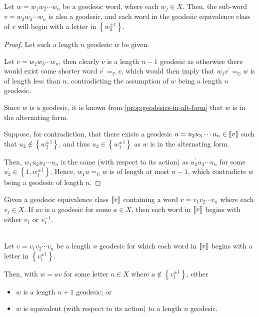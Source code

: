 \begin{proposition}
	\label{prop:geodesic-subwords}
	Let $w = w_1 w_2 \cdots w_n$ be a geodesic word, where each $w_j \in X$.
	Then, the sub-word $v = w_2 w_3 \cdots w_n$ is also a geodesic, and each word in the geodesic equivalence class of $v$ will begin with a letter in $\left\lbrace w_2^{\pm 1} \right\rbrace$.
\end{proposition}

\begin{proof}
	Let such a length $n$ geodesic $w$ be given.
	
	Let $v = w_2 w_3 \cdots w_n$, then clearly $v$ is a length $n-1$ geodesic as otherwise there would exist some shorter word $v^\prime =_\mathbb{G} v$, which would then imply that $w_1 v^\prime =_\mathbb{G} w$ is of length less than $n$, contradicting the assumption of $w$ being a length $n$ geodesic.
	
	Since $w$ is a geodesic, it is known from \cref{prop:geodesics-in-alt-form} that $w$ is in the alternating form.
	
	Suppose, for contradiction, that there exists a geodesic $u = u_2 u_3 \cdots u_n \in \left\llbracket v \right\rrbracket$ such that $u_2 \notin \left\lbrace w_2^{\pm 1} \right\rbrace$, and thus $u_2 \in \left\lbrace w_1^{\pm 1} \right\rbrace$ as $w$ is in the alternating form.
	
	Then, $w_1 u_2 u_3 \cdots u_n$ is the same (with respect to its action) as $u_2^\prime u_3 \cdots u_n$ for some $u_2^\prime \in \left\lbrace 1,w_1^{\pm 1}\right\rbrace$.
	Hence, $w_1 u =_\mathbb{G} w$ is of length at most $n-1$, which contradicts $w$ being a geodesic of length $n$.
\end{proof}

\begin{corollary}
	\label{cor:extending-geodesics-criterion}
	Given a geodesic equivalence class $\left\llbracket v \right\rrbracket$ containing a word $v = v_1 v_2 \cdots v_n$ where each $v_j \in X$.
	If $av$ is a geodesic for some $a \in X$, then each word in $\left\llbracket v \right\rrbracket$ begins with either $v_1$ or $v_1^{-1}$.
\end{corollary}

\begin{proposition}
	\label{prop:extending-geodesics}
	\ \\
	Let $v = v_1 v_2 \cdots v_n$ be a length $n$ geodesic for which each word in $\left\llbracket v \right\rrbracket$ begins with a letter in $\left\lbrace v_1^{\pm 1} \right\rbrace$.
	
	Then, with $w = a v$ for some letter $a \in X$ where $a \notin \left\lbrace v_1^{\pm 1} \right\rbrace$, either
	\begin{itemize}
		\item $w$ is a length $n+1$ geodesic; or
		\item $w$ is equivalent (with respect to its action) to a length $n$ geodesic.
	\end{itemize}
\end{proposition}

